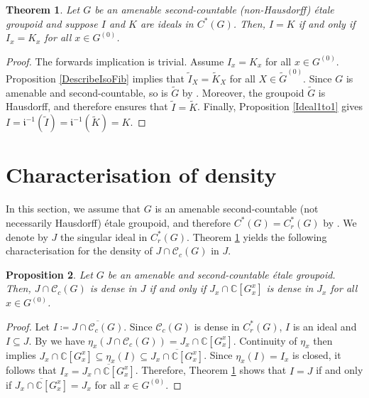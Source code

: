 \documentclass[11pt, oneside, reqno]{amsart}
\newcommand{\Gu}{G^{(0)}}
\newcommand{\cg}{\mathscr{C}_c(G)}
\newcommand{\tiG}{\tilde{G}}
\newcommand{\tiGu}{\tilde{G}^{(0)}}
\newcommand{\mfi}{\mathfrak i}
\newtheorem{thm}{Theorem}[section]
\newtheorem{prp}[thm]{Proposition}
\theoremstyle{definition}
\theoremstyle{remark}
\numberwithin{equation}{section}
\begin{document}
\begin{thm}\label{IdealFib}
    Let $G$ be an amenable second-countable (non-Hausdorff) \'etale groupoid and suppose $I$ and $K$ are ideals in $C^*(G)$. Then, $I = K$ if and only if $I_{x} = K_{x}$ for all $x\in \Gu$.
\end{thm}
\begin{proof}
    The forwards implication is trivial. Assume $I_{x} = K_{x}$ for all $x\in \Gu$. Proposition \ref{DescribeIsoFib} implies that $\tilde{I}_{X} = \tilde{K}_{X}$ for all $X\in \tiGu$. Since $G$ is amenable and second-countable, so is $\tiG$ by \cite[Theorem~6.5]{BGHL}. Moreover, the groupoid $\tiG$ is Hausdorff, and therefore \cite[Theorem~2.10]{CN24} ensures that $\tilde{I} = \tilde{K}$. Finally, Proposition \ref{Ideal1to1} gives $I = \mfi^{-1}(\tilde{I}) = \mfi^{-1}(\tilde{K}) = K$.
\end{proof}




\section{Characterisation of density}\label{sub:CharDens}
In this section, we assume that $G$ is an amenable second-countable (not necessarily Hausdorff) \'etale groupoid, and therefore $C^*(G) = C^*_r(G)$ by \cite[Corollary~6.10]{BGHL}. We denote by $J$ the singular ideal in $C^*_r(G)$. Theorem \ref{IdealFib} yields the following characterisation for the density of $J \cap \cg$ in $J$.
\begin{prp}\label{DensChar}
    Let $G$ be an amenable and second-countable \'etale groupoid. Then, $J\cap \cg$ is dense in $J$ if and only if $J_{x} \cap \mathbb{C}[G^{x}_{x}]$ is dense in $J_{x}$ for all $x\in \Gu$.
\end{prp}

\begin{proof}
    Let $I \coloneq \overline{J\cap\mathscr{C}_{c}(G)}$. Since $\cg$ is dense in $C^{*}_{r}(G)$, $I$ is an ideal and $I\subseteq J$. By \cite[Theorem~5.5 \& Proposition~5.19]{Hume} we have $\eta_{x}(J\cap\mathscr{C}_{c}(G)) = J_{x}\cap\mathbb{C}[G^{x}_{x}]$. Continuity of $\eta_{x}$ then implies $J_{x}\cap\mathbb{C}[G^{x}_{x}]\subseteq \eta_{x}(I) \subseteq \overline{J_{x}\cap\mathbb{C}[G^{x}_{x}]} $. Since $\eta_{x}(I) = I_x$ is closed, it follows that $I_{x} = \overline{J_{x}\cap\mathbb{C}[G^{x}_{x}]}$. Therefore, Theorem \ref{IdealFib} shows that $I=J$ if and only if $\overline{J_{x} \cap \mathbb{C}[G^{x}_{x}]} = J_{x}$ for all $x\in \Gu$.
\end{proof}
\end{document}
